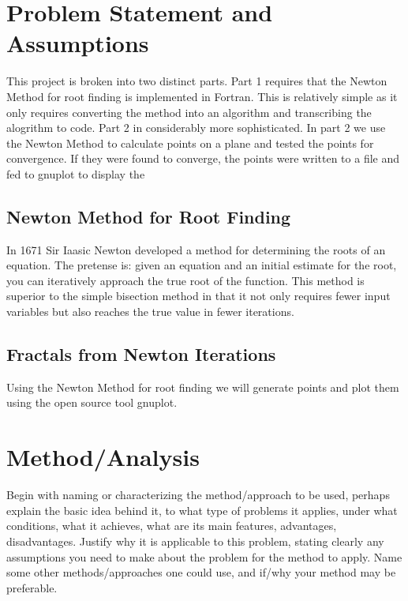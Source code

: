 \documentclass[11pt]{article}
\begin{document}
\section{Problem Statement and Assumptions}\label{S:2}
This project is broken into two distinct parts. Part 1 requires that the Newton Method for root finding is implemented in Fortran. This is relatively simple as it only requires converting the method into an algorithm and transcribing the alogrithm to code. Part 2 in considerably more sophisticated. In part 2 we use the Newton Method to calculate points on a plane and tested the points for convergence. If they were found to converge, the points were written to a file and fed to gnuplot to display the 


\subsection{Newton Method for Root Finding}\label{S:2.1}
In 1671 Sir Iaasic Newton developed a method for determining the roots of an equation. The pretense is: given an equation and an initial estimate for the root, you can iteratively approach the true root of the function. This method is superior to the simple bisection method in that it not only requires fewer input variables but also reaches the true value in fewer iterations. 

\subsection{Fractals from Newton Iterations}\label{S:2.2}
Using the Newton Method for root finding we will generate points and plot them using the open source tool gnuplot.

\section{Method/Analysis}\label{S:3}
Begin with naming or characterizing the method/approach to be used, perhaps explain the basic idea behind it, to what type of problems it applies, under what conditions, what it achieves, what are its main features, advantages, disadvantages. Justify why it is applicable to this problem, stating clearly any assumptions you need to make about the problem for the method to apply. Name some other methods/approaches one could use, and if/why your method may be preferable.
\end{document}
